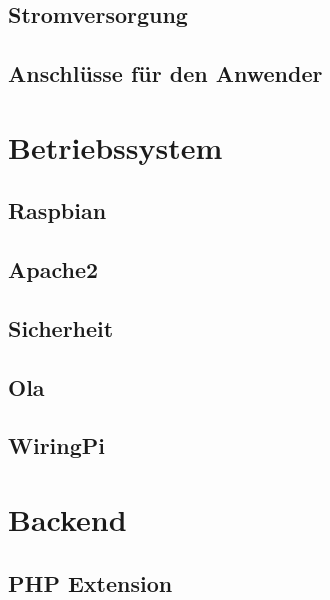 \hypertarget{stromversorgung}{%
\subsection{Stromversorgung}\label{stromversorgung}}

\hypertarget{anschluxfcsse-fuxfcr-den-anwender}{%
\subsection{Anschlüsse für den
Anwender}\label{anschluxfcsse-fuxfcr-den-anwender}}

\hypertarget{betriebssystem}{%
\section{Betriebssystem}\label{betriebssystem}}

\hypertarget{raspbian}{%
\subsection{Raspbian}\label{raspbian}}

\hypertarget{apache2}{%
\subsection{Apache2}\label{apache2}}

\hypertarget{sicherheit}{%
\subsection{Sicherheit}\label{sicherheit}}

\hypertarget{ola}{%
\subsection{Ola}\label{ola}}

\hypertarget{wiringpi}{%
\subsection{WiringPi}\label{wiringpi}}

\hypertarget{backend}{%
\section{Backend}\label{backend}}

\hypertarget{php-extension}{%
\subsection{PHP Extension}\label{php-extension}}

